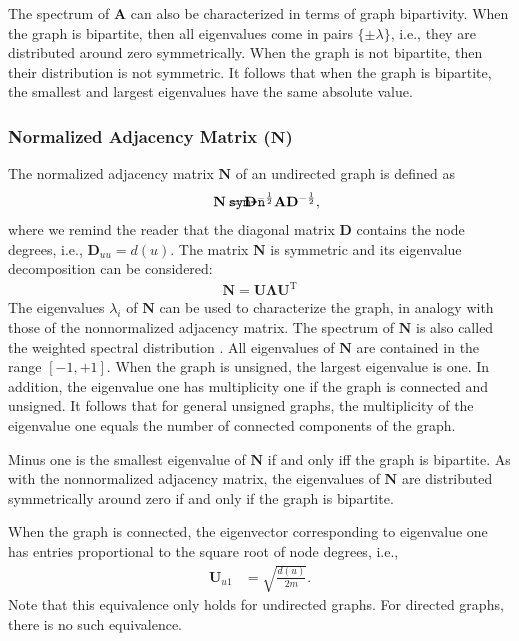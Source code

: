 \documentclass{article}
\def\mathnote#1{%
  \tag*{\rlap{\hspace\marginparsep\smash{\parbox[t]{\marginparwidth}{#1}}}}
}
\begin{document}
The spectrum of $\mathbf A$ can also be characterized in terms of graph
bipartivity.  When the graph is bipartite, then all eigenvalues come in
pairs $\{\pm\lambda\}$, i.e., they are distributed around zero
symmetrically.  When the graph is not bipartite, then their distribution
is not symmetric.  It follows that when the graph is bipartite, the
smallest and largest eigenvalues have the same absolute value. 

\subsubsection{Normalized Adjacency Matrix ($\mathbf N$)}
\label{sec:matrix.N}
The normalized adjacency matrix $\mathbf N$ of an undirected graph is
defined as 
\begin{align}
  \mathnote{\texttt{sym-n}}
  \mathbf N &= \mathbf D^{-\frac 1 2} \mathbf A \mathbf D^{-\frac 1 2},
\end{align}
where we remind the reader that the diagonal matrix $\mathbf D$
contains the node degrees, i.e., $\mathbf D_{uu} = d(u)$. 
The matrix $\mathbf N$ is symmetric and its eigenvalue decomposition can
be considered:
\begin{align}
  \mathbf N = \mathbf U \mathbf \Lambda \mathbf U^{\mathrm T}
\end{align}
The eigenvalues $\lambda_i$ of $\mathbf N$ can be used to characterize
the graph, in analogy with those of the nonnormalized adjacency
matrix.
The spectrum of $\mathbf N$ is also called the weighted spectral
distribution \citep{b864}.
All eigenvalues of $\mathbf N$ are contained in the range
$[-1,+1]$.  When the graph is unsigned, the largest eigenvalue is one.
In addition, the eigenvalue one has multiplicity one if the graph is
connected and unsigned.  It follows that for general unsigned graphs,
the multiplicity of the eigenvalue one equals the number of connected
components of the graph. 

Minus one is the smallest eigenvalue of $\mathbf N$ if and only iff the graph is
bipartite.  As with the nonnormalized adjacency matrix, the eigenvalues
of $\mathbf N$ are distributed symmetrically around zero if and only if
the graph is bipartite. 

When the graph is connected, 
the eigenvector corresponding to eigenvalue one has entries proportional
to the square root of node degrees, i.e.,
\begin{align}
  \mathbf U_{u1} &= \sqrt{\frac{d(u)}{2m}}.
\end{align}
Note that this equivalence only holds for undirected graphs.  For
directed graphs, there is no such equivalence. 
\end{document}
